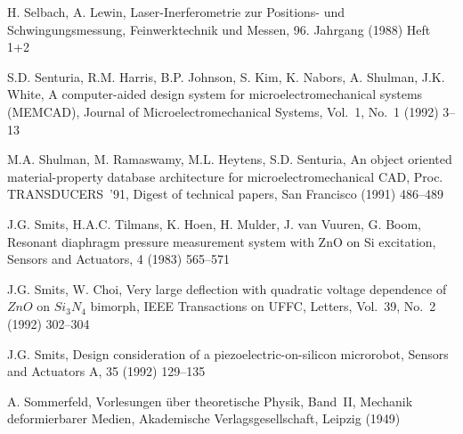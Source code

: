 \begin{thebibliography}{xxx}
 H. Selbach, A. Lewin, Laser-Inerferometrie zur Positions- und
 Schwingungsmessung, Feinwerktechnik und Messen, 96. Jahrgang (1988) Heft 1+2

 S.D. Senturia, R.M. Harris, B.P. Johnson, S. Kim, K. Nabors, A. Shulman,
 J.K. White, A computer-aided design system for microelectromechanical
 systems ({\sf MEMCAD}), Journal of Microelectromechanical Systems, Vol.~1,
 No.~1 (1992) 3--13



 M.A. Shulman, M. Ramaswamy, M.L. Heytens, S.D. Senturia, An object oriented
 material-property database architecture for microelectromechanical CAD,
 Proc. TRANSDUCERS~'91, Digest of technical papers, San Francisco
 (1991) 486--489

 J.G. Smits, H.A.C. Tilmans, K. Hoen, H. Mulder, J. van Vuuren, G. Boom,
 Resonant diaphragm pressure measurement system with ZnO on Si excitation,
 Sensors and Actuators, 4 (1983) 565--571



 J.G. Smits, W. Choi, Very large deflection with quadratic voltage dependence
 of $ZnO$ on $Si_{3}N_{4}$ bimorph, IEEE Transactions on UFFC, Letters,
 Vol.~39, No.~2 (1992) 302--304

 J.G. Smits, Design consideration of a piezoelectric-on-silicon microrobot,
 Sensors and Actuators A, 35 (1992) 129--135

 A. Sommerfeld, Vorlesungen über theoretische Physik, Band~II, Mechanik
 deformierbarer Medien, Akademische Verlagsgesellschaft, Leipzig (1949)


\end{thebibliography}

